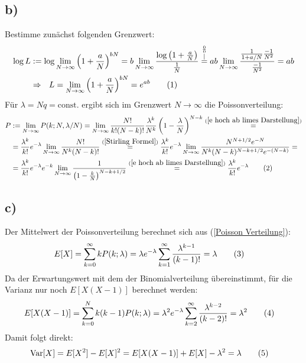 \documentclass[a4paper,12pt]{article}
\newcommand\numberthis{\addtocounter{equation}{1}\tag{\theequation}}
\newcommand{\kom}{}
\newcommand{\kla}{}
\newcommand{\tecxt}{}
\begin{document}
\subsection*{b)}Bestimme zunächst folgenden Grenzwert:
\begin{align*}
\log L&:=\log\lim_{N\rightarrow\infty}\kla\left( {1+\frac{a}{N}} \right)^{bN}=b\lim_{N\rightarrow\infty}\frac{\log\kla\left( {1+\frac{a}{N}} \right)}{\frac{1}{N}}\kom\overset{\substack{{\frac{0}{0}} \\ |}}{=}ab\lim_{N\rightarrow\infty}\frac{\frac{1}{1+a/N}\frac{-1}{N^2}}{\frac{-1}{N^2}}=ab\\
&\Rightarrow\ \ L=\lim_{N\rightarrow\infty}\kla\left( {1+\frac{a}{N}} \right)^{bN}=e^{ab}\numberthis\label{e hoch ab limes Darstellung}
\end{align*}
Für $\lambda=Nq=\tecxt\text{const.}$ ergibt sich im Grenzwert $N\rightarrow\infty$ die Poissonverteilung:
\begin{align*}
P&:=\lim_{N\rightarrow\infty}P(k;N,\lambda/N)=\lim_{N\rightarrow\infty}\frac{N!}{k!(N-k)!}\frac{\lambda^k}{N^k}\kla\left( {1-\frac{\lambda}{N}} \right)^{N-k}\overset{(\ref{e hoch ab limes Darstellung})}{=}\\
&=\frac{\lambda^k}{k!}e^{-\lambda}\lim_{N\rightarrow\infty}\frac{N!}{N^k(N-k)!}\overset{(\ref{Stirling Formel})}{=}\frac{\lambda^k}{k!}e^{-\lambda}\lim_{N\rightarrow\infty}\frac{N^{N+1/2}e^{-N}}{N^k(N-k)^{N-k+1/2}e^{-(N-k)}}=\\
&=\frac{\lambda^k}{k!}e^{-\lambda}e^{-k}\lim_{N\rightarrow\infty}\frac{1}{\kla\left( {1-\frac{k}{N}} \right)^{N-k+1/2}}\overset{(\ref{e hoch ab limes Darstellung})}{=}\frac{\lambda^k}{k!}e^{-\lambda}\numberthis\label{Poisson Verteilung}
\end{align*}
\subsection*{c)}
Der Mittelwert der Poissonverteilung berechnet sich aus (\ref{Poisson Verteilung}):
\begin{align*}
E[X]&=\sum_{k=0}^{\infty} kP(k;\lambda)=\lambda e^{-\lambda}\sum_{k=1}^{\infty}\frac{\lambda^{k-1}}{(k-1)!}=\lambda\numberthis\label{Erwartungswert Poissonverteilung}
\end{align*}
Da der Erwartungswert mit dem der Binomialverteilung übereinstimmt, für die Varianz nur noch $E[X(X-1)]$ berechnet werden:
\begin{align*}
E[X(X-1)]&=\sum_{k=0}^Nk(k-1)P(k;\lambda)=\lambda^2e^{-\lambda}\sum_{k=2}^\infty\frac{\lambda^{k-2}}{(k-2)!}=\lambda^2\numberthis\label{E von X mal X minus 1 Poisson}
\end{align*}
Damit folgt direkt:
\begin{align*}
\tecxt\text{Var}[X]&=E[X^2]-E[X]^2=E[X(X-1)]+E[X]-\lambda^2=\lambda\numberthis\label{Varianz Poissonverteilung}
\end{align*}
\end{document}

